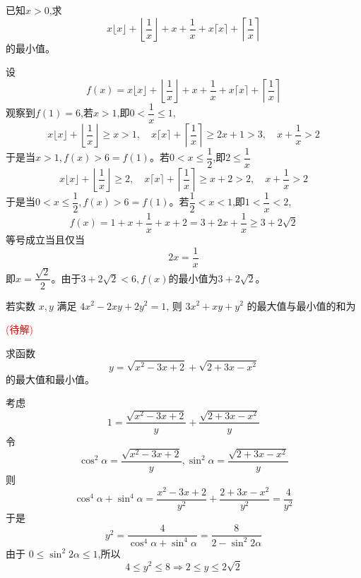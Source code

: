 \begin{questions}
    \question 已知$x>0$,求
    \[
    x\lfloor x\rfloor + \left\lfloor\frac{1}{x}\right\rfloor + x + \frac{1}{x} + x\lceil x\rceil + \left\lceil\frac{1}{x}\right\rceil
    \]
    的最小值。
    \begin{solution}
        设
        \[
        f(x)=x\lfloor x\rfloor + \left\lfloor\frac{1}{x}\right\rfloor + x + \frac{1}{x} + x\lceil x\rceil + \left\lceil\frac{1}{x}\right\rceil
        \]
        观察到$f(1)=6$,若$x > 1$,即$0 < \dfrac{1}{x} \le 1$,
        \[
        x\lfloor x\rfloor + \left\lfloor\frac{1}{x}\right\rfloor \ge x >1,\quad
        x\lceil x\rceil + \left\lceil\frac{1}{x}\right\rceil \ge 2x+1 >3,\quad
        x + \frac{1}{x} > 2
        \]
        于是当$x > 1,f(x) > 6 =f(1)$。若$0 < x \le \dfrac{1}{2}$,即$2 \le \dfrac{1}{x}$
        \[
        x\lfloor x\rfloor + \left\lfloor\frac{1}{x}\right\rfloor \ge 2, \quad
        x\lceil x\rceil + \left\lceil\frac{1}{x}\right\rceil \ge x + 2 > 2, \quad
        x + \frac{1}{x} > 2  
        \]
        于是当$0 < x \le \dfrac{1}{2},f(x) > 6 =f(1)$。若$\dfrac{1}{2} < x < 1$,即$1 < \dfrac{1}{x} < 2$,
        \[
        f(x)=1+x+\frac{1}{x}+x+2=3+2x+\frac{1}{x} \ge 3+2\sqrt{2}
        \]
        等号成立当且仅当
        \[
        2x=\frac{1}{x}
        \]
        即$x=\dfrac{\sqrt{2}}{2}$。由于$3+2\sqrt{2}<6,f(x)$的最小值为$3+2\sqrt{2}$。
    \end{solution}

    \question 若实数 $x, y$ 满足 $4x^2 - 2xy + 2y^2 = 1$, 则 $3x^2 + xy + y^2$ 的最大值与最小值的和为
    \begin{solution}
        \textcolor{red}{(待解)}
    \end{solution}

    \question 求函数 
    \[
    y = \sqrt{x^2 - 3x + 2} + \sqrt{2 + 3x - x^2}
    \]
    的最大值和最小值。
    \begin{solution}
        考虑
        \[
        1 = \frac{\sqrt{x^2 - 3x + 2}}{y} + \frac{\sqrt{2 + 3x - x^2}}{y}
        \]
        令 
        \[
        \cos^2 \alpha = \frac{\sqrt{x^2 - 3x + 2}}{y}, \sin^2 \alpha = \frac{\sqrt{2 + 3x - x^2}}{y}
        \]
        则
        \[
        \cos^4 \alpha + \sin^4 \alpha = \frac{x^2 - 3x + 2}{y^2} + \frac{2 + 3x - x^2}{y^2}= \frac{4}{y^2}
        \]
        于是
        \[
        y^2 = \frac{4}{\cos^4 \alpha + \sin^4 \alpha} = \frac{8}{2 - \sin^2 2\alpha}
        \]
        由于 $0 \le \sin^2 2\alpha \le 1$,所以 
        \[
        4 \le y^2 \le 8 \Rightarrow 2 \le y \le 2\sqrt{2}
        \]
    \end{solution}


\end{questions}
